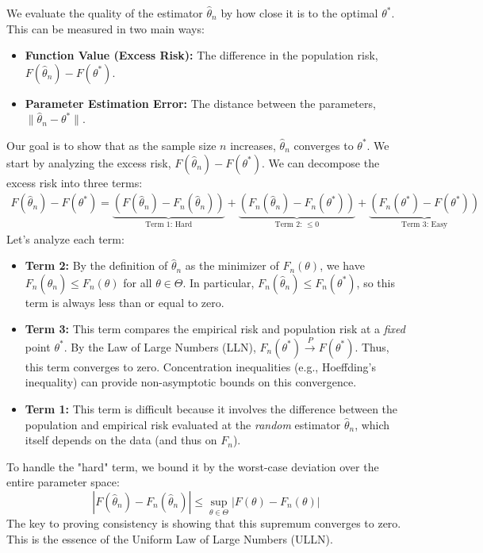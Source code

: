 We evaluate the quality of the estimator $\hat{\theta}_n$ by how close it is to the optimal $\theta^*$. This can be measured in two main ways:
\begin{itemize}
    \item \textbf{Function Value (Excess Risk):} The difference in the population risk, $F(\hat{\theta}_n) - F(\theta^*)$.
    \item \textbf{Parameter Estimation Error:} The distance between the parameters, $\|\hat{\theta}_n - \theta^*\|$.
\end{itemize}
Our goal is to show that as the sample size $n$ increases, $\hat{\theta}_n$ converges to $\theta^*$. We start by analyzing the excess risk, $F(\hat{\theta}_n) - F(\theta^*)$. We can decompose the excess risk into three terms:
\begin{align*}
    F(\hat{\theta}_n) - F(\theta^*) = \underbrace{\left( F(\hat{\theta}_n) - F_n(\hat{\theta}_n) \right)}_{\text{Term 1: Hard}} + \underbrace{\left( F_n(\hat{\theta}_n) - F_n(\theta^*) \right)}_{\text{Term 2: } \le 0} + \underbrace{\left( F_n(\theta^*) - F(\theta^*) \right)}_{\text{Term 3: Easy}}
\end{align*}
Let's analyze each term:
\begin{itemize}
    \item \textbf{Term 2:} By the definition of $\hat{\theta}_n$ as the minimizer of $F_n(\theta)$, we have $F_n(\hat{\theta}_n) \le F_n(\theta)$ for all $\theta \in \Theta$. In particular, $F_n(\hat{\theta}_n) \le F_n(\theta^*)$, so this term is always less than or equal to zero.
    \item \textbf{Term 3:} This term compares the empirical risk and population risk at a \textit{fixed} point $\theta^*$. By the Law of Large Numbers (LLN), $F_n(\theta^*) \xrightarrow{P} F(\theta^*)$. Thus, this term converges to zero. Concentration inequalities (e.g., Hoeffding's inequality) can provide non-asymptotic bounds on this convergence.
    \item \textbf{Term 1:} This term is difficult because it involves the difference between the population and empirical risk evaluated at the \textit{random} estimator $\hat{\theta}_n$, which itself depends on the data (and thus on $F_n$).
\end{itemize}
To handle the "hard" term, we bound it by the worst-case deviation over the entire parameter space:
$$ |F(\hat{\theta}_n) - F_n(\hat{\theta}_n)| \le \sup_{\theta \in \Theta} |F(\theta) - F_n(\theta)| $$
The key to proving consistency is showing that this supremum converges to zero. This is the essence of the Uniform Law of Large Numbers (ULLN).

